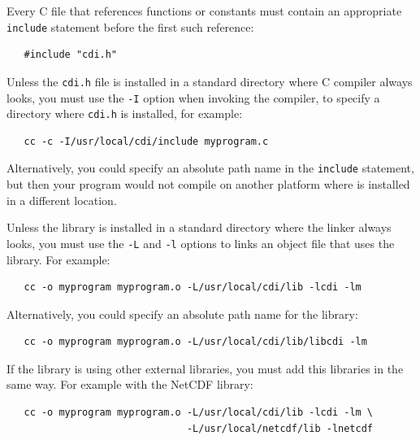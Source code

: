 Every C file that references {\CDI} functions or constants must contain
an appropriate {\tt include} statement before the first such reference:

\begin{verbatim}
   #include "cdi.h"
\end{verbatim}

Unless the {\tt cdi.h} file is installed in a standard directory where
C compiler always looks, you must use the {\tt -I} option when invoking
the compiler, to specify a directory where {\tt cdi.h} is installed, for example:

\begin{verbatim}
   cc -c -I/usr/local/cdi/include myprogram.c
\end{verbatim}

Alternatively, you could specify an absolute path name in the {\tt include}
statement, but then your program would not compile on another platform
where {\CDI} is installed in a different location.

Unless the {\CDI} library is installed in a standard directory where the linker
always looks, you must use the {\tt -L} and {\tt -l} options to links an object file that
uses the {\CDI} library. For example:

\begin{verbatim}
   cc -o myprogram myprogram.o -L/usr/local/cdi/lib -lcdi -lm
\end{verbatim}

Alternatively, you could specify an absolute path name for the library:

\begin{verbatim}
   cc -o myprogram myprogram.o -L/usr/local/cdi/lib/libcdi -lm
\end{verbatim}

If the {\CDI} library is using other external libraries, you must add this
libraries in the same way.
For example with the NetCDF library:

\begin{verbatim}
   cc -o myprogram myprogram.o -L/usr/local/cdi/lib -lcdi -lm \
                               -L/usr/local/netcdf/lib -lnetcdf
\end{verbatim}
